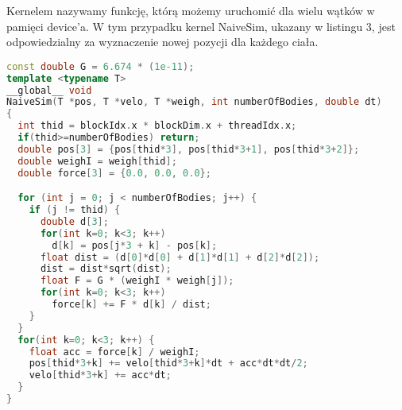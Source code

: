 \documentclass[14pt,twoside,a4paper]{article}
\theoremstyle{definition}
\begin{document}
\bigskip
\bigskip
Kernelem nazywamy funkcję, którą możemy uruchomić dla wielu wątków w pamięci device'a. W tym przypadku kernel NaiveSim, ukazany w listingu 3, jest odpowiedzialny za wyznaczenie nowej pozycji dla każdego ciała. \\
\bigskip

\begin{lstlisting}[language=C++, frame=single, framerule=2pt, caption=Kernel NaiveSim]
const double G = 6.674 * (1e-11);
template <typename T>
__global__ void 
NaiveSim(T *pos, T *velo, T *weigh, int numberOfBodies, double dt) 
{
  int thid = blockIdx.x * blockDim.x + threadIdx.x;
  if(thid>=numberOfBodies) return;
  double pos[3] = {pos[thid*3], pos[thid*3+1], pos[thid*3+2]};
  double weighI = weigh[thid];
  double force[3] = {0.0, 0.0, 0.0};

  for (int j = 0; j < numberOfBodies; j++) {
    if (j != thid) {
      double d[3];
      for(int k=0; k<3; k++) 
        d[k] = pos[j*3 + k] - pos[k];
      float dist = (d[0]*d[0] + d[1]*d[1] + d[2]*d[2]);
      dist = dist*sqrt(dist);
      float F = G * (weighI * weigh[j]);
      for(int k=0; k<3; k++)
        force[k] += F * d[k] / dist;	
    }
  }
  for(int k=0; k<3; k++) {
    float acc = force[k] / weighI;
    pos[thid*3+k] += velo[thid*3+k]*dt + acc*dt*dt/2;
    velo[thid*3+k] += acc*dt;
  }
}
\end{lstlisting}
\bigskip
\end{document}
